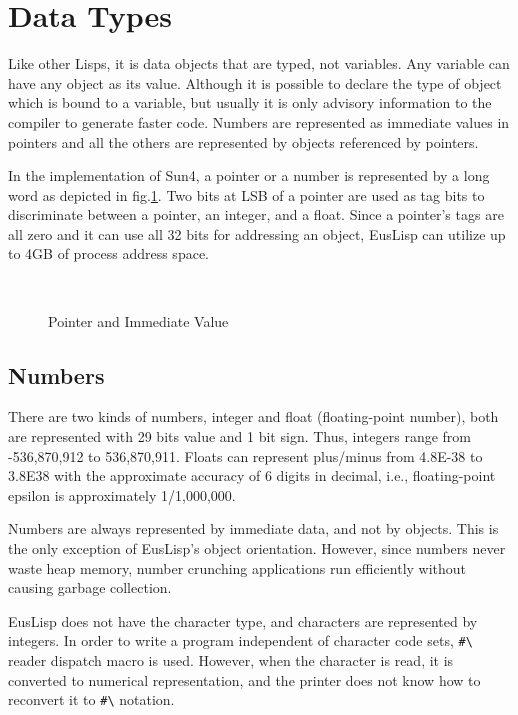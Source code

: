 
\section{Data Types}
Like other Lisps, it is data objects that are typed, not variables.
Any variable can have any object as its value.
Although it is possible to
declare the type of object which is bound to a variable, but usually
it is only advisory information to the compiler to generate faster code.
Numbers are represented as immediate values in pointers and all the others
are represented by objects referenced by pointers.

In the implementation of Sun4, a pointer or a number is represented by
a long word as depicted in fig.\ref{Pointer}.
Two bits at LSB of a pointer are used as tag bits to discriminate
between a pointer, an integer, and a float.
Since a pointer's tags are all zero and it can use all 32 bits for
addressing an object, EusLisp can utilize up to 4GB of process
address space.

\begin{figure}[hb]
\begin{center}
\mbox{
\epsfxsize=10cm
}
\end{center}
\caption{\label{Pointer}Pointer and Immediate Value}
\end{figure}

\subsection{Numbers}

There are two kinds of numbers,
integer and float (floating-point number), both are represented
with 29 bits value and 1 bit sign.
Thus, integers range from -536,870,912 to 536,870,911.
Floats can represent plus/minus from 4.8E-38 to 3.8E38 with the
approximate accuracy of 6 digits in decimal, i.e.,
floating-point epsilon is approximately 1/1,000,000.

Numbers are always represented by immediate data, and not by objects.
This is the only exception of EusLisp's object orientation.
However, since numbers never waste heap memory, number crunching applications
run efficiently without causing garbage collection.

EusLisp does not have the character type,
and characters are represented by integers.
In order to write a program independent of character code sets,
\verb+#\+ reader dispatch macro is used.
However, when the character is read,
it is converted to numerical representation, and the printer does not
know how to reconvert it to
\verb+#\+ notation.

